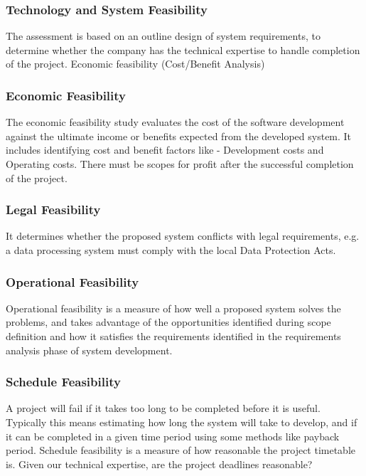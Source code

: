 \documentclass[12pt, a4paper]{report}
\begin{document}
    \subsubsection{Technology and System Feasibility}
    The assessment is based on an outline design of system requirements, to determine whether the company has the technical expertise to handle completion of the project. Economic feasibility (Cost/Benefit Analysis)
  
    \subsubsection{Economic Feasibility}
    The economic feasibility study evaluates the cost of the software development against the ultimate income or benefits expected from the developed system. It includes identifying cost and benefit factors like - Development costs and Operating costs. There must be scopes for profit after the successful completion of the project.
  
    \subsubsection{Legal Feasibility}
    It determines whether the proposed system conflicts with legal requirements, e.g. a data processing system must comply with the local Data Protection Acts.
  
    \subsubsection{Operational Feasibility}
    Operational feasibility is a measure of how well a proposed system solves the problems, and takes advantage of the opportunities identified during scope definition and how it satisfies the requirements identified in the requirements analysis phase of system development.
  
    \subsubsection{Schedule Feasibility}
    A project will fail if it takes too long to be completed before it is useful. Typically this means estimating how long the system will take to develop, and if it can be completed in a given time period using some methods like payback period. Schedule feasibility is a measure of how reasonable the project timetable is. Given our technical expertise, are the project deadlines reasonable?
    
\end{document}
